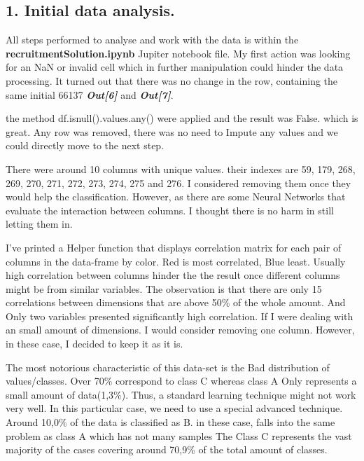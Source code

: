 \documentclass[11pt,pressrelease]{newlfm} %
\begin{document}
\begin{newlfm}


\begin{singlespace} %

\section{1. Initial data analysis.}


All steps performed to analyse and work with the data is within the \textbf{recruitmentSolution.ipynb} Jupiter notebook file. My first action was looking for an NaN or invalid cell which in further manipulation could hinder the data processing. It turned out that there was no change in the row, containing the same initial 66137 \textbf{\textit{Out[6]}} and \textbf{\textit{Out[7]}}. 

the method df.isnull().values.any() were applied and the result was False. which is great. Any row was removed, there was no need to Impute any values and we could directly move to the next step.

There were around 10 columns with unique values. their indexes are 59, 179, 268, 269, 270, 271, 272, 273, 274, 275 and 276. I considered removing them once they would help the classification. However, as there are some Neural Networks that evaluate the interaction between columns. I thought there is no harm in still letting them in.

I've printed a Helper function that displays correlation matrix for each pair of columns in the data-frame by color. Red is most correlated, Blue least. Usually high correlation between columns hinder the the result once different columns might be from similar variables. The observation is that there are only 15 correlations between dimensions that are above 50\% of the whole amount. And Only two variables presented significantly high correlation. If I were dealing with an small amount of dimensions. I would consider removing one column. However, in these case, I decided to keep it as it is.

The most notorious characteristic of this data-set is the Bad distribution of values/classes. Over 70\% correspond to class C whereas class A Only represents a small amount of data(1,3\%). Thus, a standard learning technique might not work very well. In this particular case, we need to use a special advanced technique. Around 10,0\% of the data is classified as B. in these case, falls into the same problem as class A which has not many samples
The Class C represents the vast majority of the cases covering around 70,9\% of the total amount of classes.


\end{singlespace}
\end{newlfm}
\end{document}

